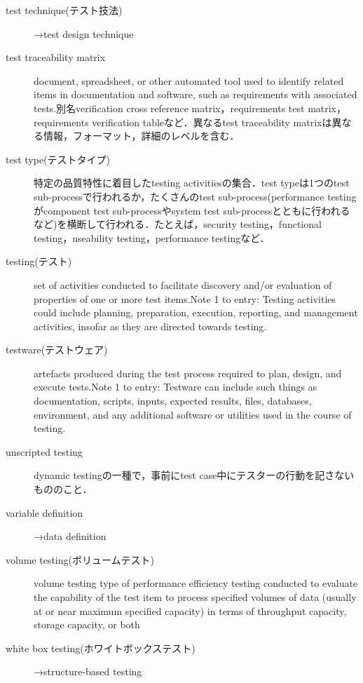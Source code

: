 \begin{description}
    \item[test technique(テスト技法)]→test design technique
    \item[test traceability matrix]document, spreadsheet, or other automated tool used to identify related items in documentation and software, such as requirements with associated tests.別名verification cross reference matrix，requirements test matrix，requirements verification tableなど．異なるtest traceability matrixは異なる情報，フォーマット，詳細のレベルを含む．
    \item[test type(テストタイプ)]特定の品質特性に着目したtesting activitiesの集合．test typeは1つのtest sub-processで行われるか，たくさんのtest sub-process(performance testingがcomponent test sub-processやsystem test sub-processとともに行われるなど)を横断して行われる．たとえば，security testing，functional testing，useability testing，performance testingなど．
    \item[testing(テスト)]set of activities conducted to facilitate discovery and/or evaluation of properties of one or more test items.Note 1 to entry: Testing activities could include planning, preparation, execution, reporting, and management activities, insofar as they are directed towards testing.
    \item[testware(テストウェア)]artefacts produced during the test process required to plan, design, and execute tests.Note 1 to entry: Testware can include such things as documentation, scripts, inputs, expected results, files, databases, environment, and any additional software or utilities used in the course of testing.
    \item[unscripted testing]dynamic testingの一種で，事前にtest case中にテスターの行動を記さないもののこと．
    \item[variable definition]→data definition
    \item[volume testing(ボリュームテスト)]volume testing type of performance efficiency testing conducted to evaluate the capability of the test item to process specified volumes of data (usually at or near maximum specified capacity) in terms of throughput capacity, storage capacity, or both
    \item[white box testing(ホワイトボックステスト)]→structure-based testing
\end{description}


